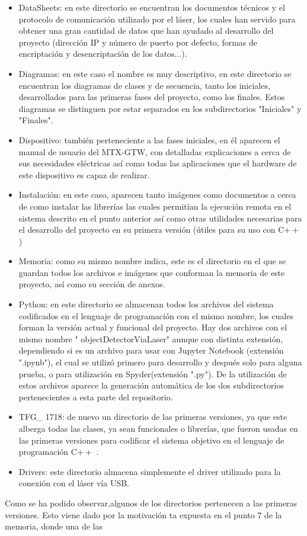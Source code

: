 \begin{itemize}
	\item DataSheets: en este directorio se encuentran los documentos técnicos y el protocolo de comunicación utilizado por el láser, los cuales han servido para obtener una gran cantidad de datos que han ayudado al desarrollo del proyecto (dirección IP y número de puerto por defecto, formas de encriptación y desencriptación de los datos...).
	\item Diagramas: en este caso el nombre es muy descriptivo, en este directorio se encuentran los diagramas de clases y de secuencia, tanto los iniciales, desarrollados para las primeras fases del proyecto, como los finales. Estos diagramas se distinguen por estar separados en los subdirectorios "Iniciales" y "Finales".
	\item Dispositivo: también perteneciente a las fases iniciales, en él aparecen el manual de usuario del MTX-GTW, con detalladas explicaciones a cerca de sus necesidades eléctricas así como todas las aplicaciones que el hardware de este dispositivo es capaz de realizar.
	\item Instalación: en este caso, aparecen tanto imágenes como documentos a cerca de como instalar las librerías las cuales permitían la ejecución remota en el sistema descrito en el punto anterior así como otras utilidades necesarias para el desarrollo del proyecto en su primera versión (útiles para su uso con C$++$)
	\item Memoria: como su mismo nombre indica, este es el directorio en el que se guardan todos los archivos e imágenes que conforman la memoria de este proyecto, así como su sección de anexos.
	\item Python: en este directorio se almacenan todos los archivos del sistema codificados en el lenguaje de programación con el mismo nombre, los cuales forman la versión actual y funcional del proyecto. Hay dos archivos con el mismo nombre " objectDetectorViaLaser" aunque con distinta extensión, dependiendo si es un archivo para usar con Jupyter Notebook (extensión ".ipynb"), el cual se utilizó primero para desarrollo y después solo para alguna prueba, o para utilización en Spyder(extensión ".py"). De la utilización de estos archivos aparece la generación automática de los dos subdirectorios pertenecientes a esta parte del repositorio.
	\item TFG\_ 1718: de nuevo un directorio de las primeras versiones, ya que este alberga todas las clases, ya sean funcionales o librerías, que fueron usadas en las primeras versiones para codificar el sistema objetivo en el lenguaje de programación C$++$ .
	\item Drivers: este directorio almacena simplemente el driver utilizado para la conexión con el láser vía USB.
\end{itemize}
Como se ha podido observar,algunos de los directorios pertenecen a las primeras versiones. Esto viene dado por la motivación ta expuesta en el punto 7 de la memoria, donde una de las 
